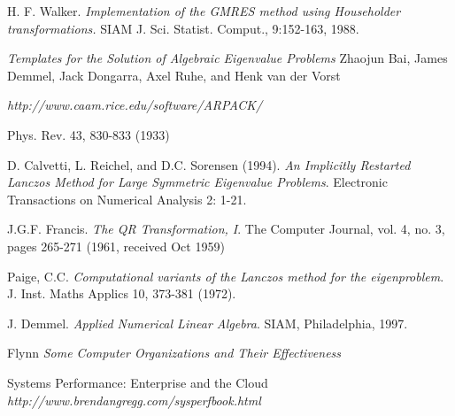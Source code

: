 \documentclass[a4paper,openright,12pt, oneside]{book}
\begin{document}
\begin{thebibliography}{X}
    H. F. Walker. 
    \emph{Implementation of the GMRES method using Householder transformations.}
    SIAM J. Sci. Statist. Comput., 9:152-163, 1988.

    \emph{Templates for the Solution of Algebraic Eigenvalue Problems}
    Zhaojun Bai, James Demmel, Jack Dongarra, Axel Ruhe, and Henk van der Vorst

    \emph{http://www.caam.rice.edu/software/ARPACK/}

    Phys. Rev. 43, 830-833 (1933)

    D. Calvetti, L. Reichel, and D.C. Sorensen (1994). 
    \emph{An Implicitly Restarted Lanczos Method for Large Symmetric Eigenvalue Problems}. 
    Electronic Transactions on Numerical Analysis 2: 1-21.

    J.G.F. Francis.
    \emph {The QR Transformation, I}.
    The Computer Journal, vol. 4, no. 3, pages 265-271 (1961, received Oct 1959) 

    Paige, C.C. 
    \emph{Computational variants of the Lanczos method for the eigenproblem}.
    J. Inst. Maths Applics 10, 373-381 (1972).

    J. Demmel. 
    \emph{Applied Numerical Linear Algebra}.
    SIAM, Philadelphia, 1997.

  Flynn
  \emph{Some Computer Organizations and Their Effectiveness}

  Systems Performance: Enterprise and the Cloud
  \emph{http://www.brendangregg.com/sysperfbook.html}

\end{thebibliography}
\end{document}
